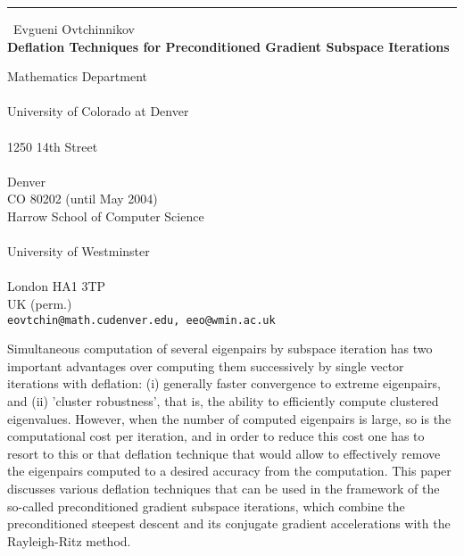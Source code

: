 \documentclass{report}
\begin{document}
\begin{center}
\rule{6in}{1pt} \
{\large Evgueni Ovtchinnikov \\
{\bf Deflation Techniques for Preconditioned Gradient Subspace Iterations}}

Mathematics Department \\ \\ University of Colorado at Denver \\ \\ 1250 14th Street \\ \\ Denver \\ CO 80202 (until May 2004) \\ Harrow School of Computer Science \\ \\ University of Westminster \\ \\ London HA1 3TP \\ UK (perm.)
\\
{\tt eovtchin@math.cudenver.edu, eeo@wmin.ac.uk}\end{center}

Simultaneous computation of several eigenpairs by subspace iteration has
two important advantages over computing them successively by single
vector iterations with deflation: (i) generally faster convergence to
extreme eigenpairs, and (ii) 'cluster robustness', that is, the ability
to efficiently compute clustered eigenvalues. However, when the number of
computed eigenpairs is large, so is the computational cost per iteration,
and in order to reduce this cost one has to resort to this or that
deflation technique that would allow to effectively remove the eigenpairs
computed to a desired accuracy from the computation. This paper discusses
various deflation techniques that can be used in the framework of the
so-called preconditioned gradient subspace iterations, which combine the
preconditioned steepest descent and its conjugate gradient accelerations
with the Rayleigh-Ritz method.
\end{document}
